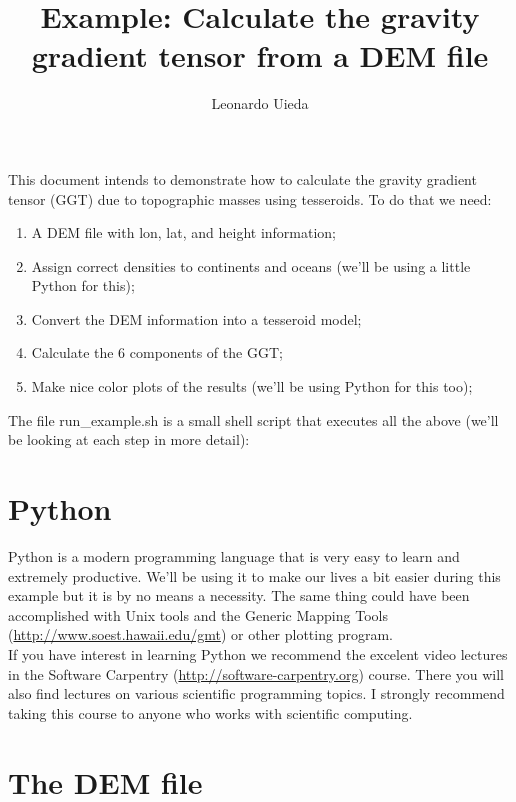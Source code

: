 \documentclass[a4paper]{article}
\title{Example: Calculate the gravity gradient tensor from a DEM file}
\author{Leonardo Uieda}
\begin{document}
\maketitle

\lstset{numbers=left,
        basicstyle=\footnotesize,
        title=\lstname,
        showstringspaces=false,
        frame=lines,
        breaklines=true}

This document intends to demonstrate how to calculate the gravity gradient
tensor (GGT) due to topographic masses using tesseroids. To do that we need:
    
\begin{enumerate}
    \item A DEM file with lon, lat, and height information;
    \item Assign correct densities to continents and oceans (we'll be using a little
          Python for this);
    \item Convert the DEM information into a tesseroid model;
    \item Calculate the 6 components of the GGT;
    \item Make nice color plots of the results (we'll be using Python for this too);
\end{enumerate}

\noindent The file run\_example.sh is a small shell script that executes all the above
(we'll be looking at each step in more detail):



\section{Python}

Python is a modern programming language that is very easy to learn and extremely
productive.
We'll be using it to make our lives a bit easier during this example but it is by
no means a necessity.
The same thing could have been accomplished with Unix tools and the Generic
Mapping Tools (\url{http://www.soest.hawaii.edu/gmt}) or other plotting program.
\\
If you have interest in learning Python we recommend the excelent video lectures
in the Software Carpentry (\url{http://software-carpentry.org}) course.
There you will also find lectures on various scientific programming topics.
I strongly recommend taking this course to anyone who works with scientific computing.

\section{The DEM file}
\end{document}
